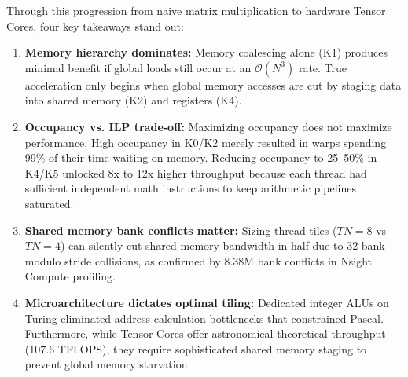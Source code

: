\documentclass[11pt]{article}
\begin{document}
Through this progression from naive matrix multiplication to hardware Tensor Cores, four key takeaways stand out:
\begin{enumerate}
    \item \textbf{Memory hierarchy dominates:} Memory coalescing alone (K1) produces minimal benefit if global loads still occur at an $\mathcal{O}(N^3)$ rate. True acceleration only begins when global memory accesses are cut by staging data into shared memory (K2) and registers (K4).
    \item \textbf{Occupancy vs. ILP trade-off:} Maximizing occupancy does not maximize performance. High occupancy in K0/K2 merely resulted in warps spending 99\% of their time waiting on memory. Reducing occupancy to 25--50\% in K4/K5 unlocked 8x to 12x higher throughput because each thread had sufficient independent math instructions to keep arithmetic pipelines saturated.
    \item \textbf{Shared memory bank conflicts matter:} Sizing thread tiles ($TN=8$ vs $TN=4$) can silently cut shared memory bandwidth in half due to 32-bank modulo stride collisions, as confirmed by 8.38M bank conflicts in Nsight Compute profiling.
    \item \textbf{Microarchitecture dictates optimal tiling:} Dedicated integer ALUs on Turing eliminated address calculation bottlenecks that constrained Pascal. Furthermore, while Tensor Cores offer astronomical theoretical throughput (107.6 TFLOPS), they require sophisticated shared memory staging to prevent global memory starvation.
\end{enumerate}
\end{document}
